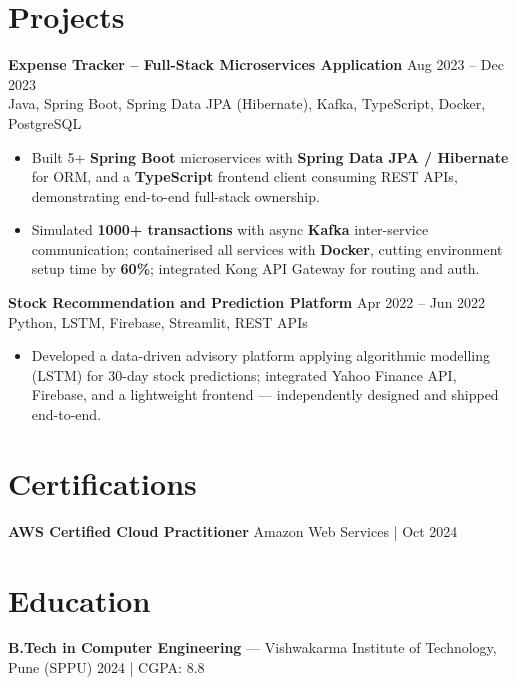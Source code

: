 \documentclass[10pt,letterpaper]{article}
\newcommand{\resumeSubheading}[4]{%
  \textbf{#1} \hfill #2 \\
  #3 \hfill #4 \\
}
\begin{document}
\section*{Projects}

\resumeSubheading{Expense Tracker -- Full-Stack Microservices Application}{Aug 2023 -- Dec 2023}{}{Java, Spring Boot, Spring Data JPA (Hibernate), Kafka, TypeScript, Docker, PostgreSQL}
\begin{itemize}
    \item Built 5+ \textbf{Spring Boot} microservices with \textbf{Spring Data JPA / Hibernate} for ORM, and a \textbf{TypeScript} frontend client consuming REST APIs, demonstrating end-to-end full-stack ownership.
    \item Simulated \textbf{1000+ transactions} with async \textbf{Kafka} inter-service communication; containerised all services with \textbf{Docker}, cutting environment setup time by \textbf{60\%}; integrated Kong API Gateway for routing and auth.
\end{itemize}

\resumeSubheading{Stock Recommendation and Prediction Platform}{Apr 2022 -- Jun 2022}{}{Python, LSTM, Firebase, Streamlit, REST APIs}
\begin{itemize}
    \item Developed a data-driven advisory platform applying algorithmic modelling (LSTM) for 30-day stock predictions; integrated Yahoo Finance API, Firebase, and a lightweight frontend --- independently designed and shipped end-to-end.
\end{itemize}

\section*{Certifications}
\textbf{AWS Certified Cloud Practitioner} \hfill Amazon Web Services \;|\; Oct 2024

\section*{Education}
\textbf{B.Tech in Computer Engineering} --- Vishwakarma Institute of Technology, Pune (SPPU) \hfill 2024 \;|\; CGPA: 8.8
\end{document}
